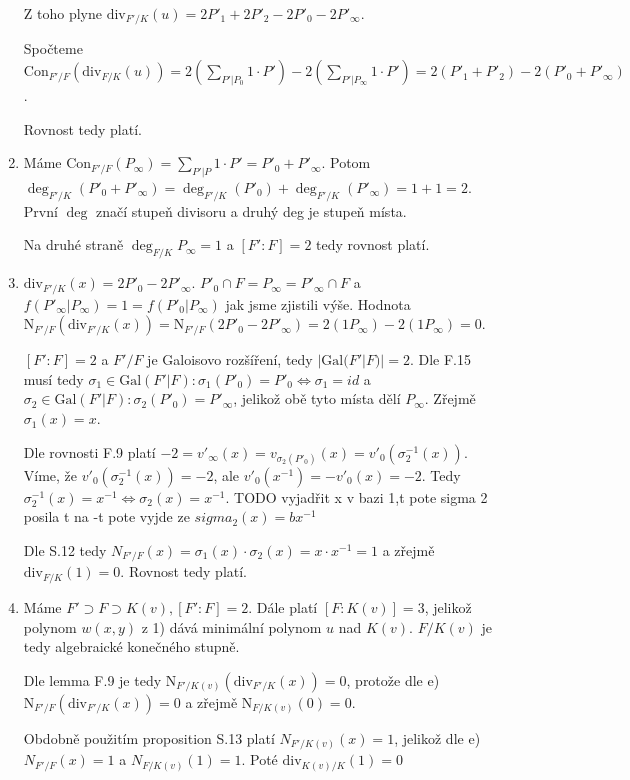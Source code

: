 \documentclass[12pt, a4paper]{article}
\begin{document}
\begin{enumerate}[label=(\alph*)]
    Z toho plyne $\text{div}_{F'/K}(u) = 2P'_1 + 2P'_2 - 2P'_0 - 2P'_\infty$.

    Spočteme $\text{Con}_{F'/F}(\text{div}_{F/K}(u)) = 2(\sum\limits_{P'|P_0}1\cdot P') -2(\sum\limits_{P'|P_\infty}1\cdot P') = 2(P'_1+P'_2)-2(P'_0+P'_\infty)$.

    Rovnost tedy platí.

    \item Máme $\text{Con}_{F'/F}(P_\infty) = \sum\limits_{P'|P}1\cdot P' = P'_0 + P'_\infty$. Potom $\deg_{F'/K}(P'_0+P'_\infty) = \deg_{F'/K}(P'_0) + \deg_{F'/K}(P'_\infty) = 1+1=2$. První $\deg$ značí stupeň divisoru a druhý deg je stupeň místa.

    Na druhé straně $\deg_{F/K}{P_\infty} = 1$ a $[F':F] = 2$ tedy rovnost platí.

    \item $\text{div}_{F'/K}(x) = 2P'_0 - 2P'_\infty$. $P'_0 \cap F = P_\infty = P'_\infty \cap F$ a $f(P'_\infty|P_\infty)=1=f(P'_0|P_\infty)$ jak jsme zjistili výše. Hodnota $\text{N}_{F'/F}(\text{div}_{F'/K}(x)) = \text{N}_{F'/F}(2P'_0 - 2P'_\infty) = 2(1P_\infty)-2(1P_\infty) = 0$.

    $[F':F]=2$ a $F'/F$ je Galoisovo rozšíření, tedy $|\text{Gal}(F'|F)|=2$. Dle F.15 musí tedy $\sigma_1 \in \text{Gal}(F'|F): \sigma_1(P'_0)=P'_0 \iff \sigma_1 = id$ a $\sigma_2 \in \text{Gal}(F'|F): \sigma_2(P'_0)=P'_\infty$, jelikož obě tyto místa dělí $P_\infty$. Zřejmě $\sigma_1(x)=x$. 

    Dle rovnosti F.9 platí $-2=v'_\infty(x)=v_{\sigma_2(P'_0)}(x)=v'_0(\sigma_2^{-1}(x))$. Víme, že $v'_0(\sigma_2^{-1}(x))=-2$, ale $v'_0(x^{-1})=-v'_0(x)=-2$. Tedy $\sigma_2^{-1}(x) = x^{-1} \iff \sigma_2(x) = x^{-1}$. TODO vyjadřit x v bazi 1,t pote sigma 2 posila t na -t pote vyjde ze $sigma_2(x)=bx^{-1}$

    Dle S.12 tedy $N_{F'/F}(x)=\sigma_1(x)\cdot \sigma_2(x) = x \cdot x^{-1} = 1$ a zřejmě $\text{div}_{F/K}(1) = 0$. Rovnost tedy platí.

    \item Máme $F' \supset F \supset K(v), [F':F]=2$. Dále platí $[F:K(v)]=3$, jelikož polynom $w(x,y)$ z 1) dává minimální polynom $u$ nad $K(v)$. $F/K(v)$ je tedy algebraické konečného stupně.

    Dle lemma F.9 je tedy $\text{N}_{F'/K(v)}(\text{div}_{F'/K}(x)) = 0$, protože dle e) $\text{N}_{F'/F}(\text{div}_{F'/K}(x)) = 0$ a zřejmě $\text{N}_{F/K(v)}(0) = 0$. 

    Obdobně použitím proposition S.13 platí $N_{F'/K(v)}(x) = 1$, jelikož dle e) $N_{F'/F}(x) = 1$ a $N_{F/K(v)}(1) = 1$. Poté $\text{div}_{K(v)/K}(1) = 0$
\end{enumerate}
\end{document}
